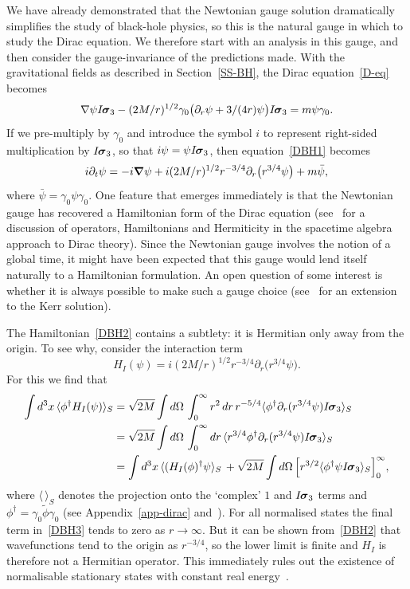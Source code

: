 \documentclass[a4paper]{article}
\numberwithin{equation}{section}
\newcommand{\nn}{\nonumber}
\newcommand{\la}{\langle}
\newcommand{\ra}{\rangle}
\newcommand{\eqv}{=}
\newcommand{\sig}{\mbox{\boldmath $\sigma$}}
\newcommand{\Om}{\Omega}
\newcommand{\bsig}{\mbox{\boldmath $\sig$}}
\newcommand{\dr}{\partial_r}
\newcommand{\dift}{\partial_t}
\newcommand{\isk}{I \hspace{-1pt} \bsig_3}
\newcommand{\go}{\gamma_{0}}
\newcommand{\psibar}{\bar{\psi}}
\newcommand{\phirev}{\tilde{\phi}}
\newcommand{\phidag}{\phi^{\dagger}}
\newcommand{\grad}{\nabla}
\newcommand{\bgrad}{\mbox{\boldmath $\grad$}}
\begin{document}
We have already demonstrated that the Newtonian gauge solution
dramatically simplifies the study of black-hole physics, so this is
the natural gauge in which to study the Dirac equation.  We therefore
start with an analysis in this gauge, and then consider the
gauge-invariance of the predictions made.  With the gravitational
fields as described in Section~\ref{SS-BH}, the Dirac
equation~\eqref{D-eq} becomes
%
\begin{equation}
\grad \psi \isk - (2M/r)^{1/2} \go \bigl( \dr \psi + 3/(4r) \psi
\bigr) \isk = m \psi \go. 
\label{DBH1}
\end{equation}
%
If we pre-multiply by $\go$ and introduce the symbol $i$ to represent
right-sided multiplication by $\isk$, so that $i\psi\eqv\psi \isk$,
then equation~\eqref{DBH1} becomes
%
\begin{equation}
i \dift \psi = -i \bgrad \psi + i (2M/r)^{1/2} r^{-3/4} \dr \bigl(
r^{3/4} \psi \bigr) + m \psibar ,
\label{DBH2}
\end{equation}
%
where $\psibar\eqv\go\psi\go$.  One feature that emerges immediately
is that the Newtonian gauge has recovered a Hamiltonian form of the
Dirac equation (see~\cite{DGL95-elphys} for a discussion of operators,
Hamiltonians and Hermiticity in the spacetime algebra approach to
Dirac theory).  Since the Newtonian gauge involves the notion of a
global time, it might have been expected that this gauge would lend
itself naturally to a Hamiltonian formulation.  An open question of
some interest is whether it is always possible to make such a gauge
choice (see~\cite{D00-kerr,gap} for an extension to the Kerr
solution).



The Hamiltonian~\eqref{DBH2} contains a subtlety: it is Hermitian only
away from the origin.  To see why, consider the interaction term
%
\begin{equation}
H_I (\psi) = i  (2M/r)^{1/2} r^{-3/4} \dr \bigl(r^{3/4} \psi \bigr) .
\end{equation}
%
For this we find that
%
\begin{align}
\int d^3 x \, \la \phidag H_I(\psi) \ra_S
&= \sqrt{2M} \int d\Om \, \int_0^\infty r^2 \,dr\, r^{-5/4} \la
\phidag \dr (r^{3/4} \psi) \isk \ra_S \nn \\
&= \sqrt{2M} \int d\Om \, \int_0^\infty dr\, \la r^{3/4} \phidag \dr
(r^{3/4} \psi) \isk \ra_S \nn \\
&= \int  d^3 x \, \la (H_I(\phi)^\dagger \psi \ra_S \, + 
\sqrt{2M} \int d\Om \, \Bigl[ r^{3/2} \la \phidag \psi \isk \ra_S
\Bigr]_0^\infty ,
\label{DBH3}
\end{align} 
%
where $\la \, \ra_S$ denotes the projection onto the `complex' $1$ and
$\isk$ terms and $\phidag\eqv\go\phirev\go$ (see
Appendix~\ref{app-dirac} and~\cite{DGL95-elphys}).  For all normalised
states the final term in~\eqref{DBH3} tends to zero as
$r\rightarrow\infty$.  But it can be shown from~\eqref{DBH2} that
wavefunctions tend to the origin as $r^{-3/4}$, so the lower limit is
finite and $H_I$ is therefore not a Hermitian operator.  This
immediately rules out the existence of normalisable stationary states
with constant real energy~\cite{bstates}.
\end{document}
